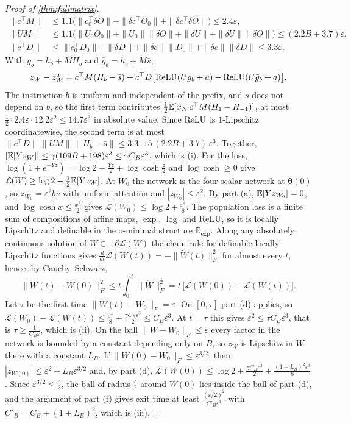 \begin{proof}[Proof of \cref{thm:fullmatrix}]
\begin{align*}
 \|c^\top M\|&\le1.1\bigl(\|c_0^\top\delta O\|+\|\delta c^\top O_0\|+\|\delta c^\top\delta O\|\bigr)\le2.4\varepsilon,\\
 \|UM\|&\le1.1\bigl(\|U_0O_0\|+\|U_0\|\|\delta O\|+\|\delta U\|+\|\delta U\|\|\delta O\|\bigr)\le(2.2B+3.7)\varepsilon,\\
 \|c^\top D\|&\le\|c_0^\top D_0\|+\|\delta D\|+\|\delta c\|\|D_0\|+\|\delta c\|\|\delta D\|\le3.3\varepsilon .
\end{align*}
With $g_b=h_b+MH_b$ and $\bar g_b=h_b+M\bar s$,
\[
 z_W-z^{\mathrm u}_W=c^\top M(H_b-\bar s)+c^\top D\bigl[\operatorname{ReLU}(Ug_b+a)-\operatorname{ReLU}(U\bar g_b+a)\bigr].
\]
The instruction $b$ is uniform and independent of the prefix, and $\bar s$ does not depend on $b$, so the first term contributes
$\tfrac12\mathbb E[x_N\,c^\top M(H_1-H_{-1})]$, at most $\tfrac12\cdot2.4\varepsilon\cdot12.2\varepsilon^2\le14.7\varepsilon^3$ in absolute value.
Since $\operatorname{ReLU}$ is $1$-Lipschitz coordinatewise, the second term is at most $\|c^\top D\|\,\|UM\|\,\|H_b-\bar s\|\le3.3\cdot15\,(2.2B+3.7)\,\varepsilon^3$.
Together, $|\mathbb E[Yz_W]|\le\gamma(109B+198)\varepsilon^3\le\gamma C_B\varepsilon^3$, which is (i).
For the loss, $\log(1+e^{-Yz})=\log2-\tfrac{Yz}{2}+\log\cosh\tfrac{z}{2}$ and $\log\cosh\ge0$ give $\mathcal L(W)\ge\log2-\tfrac12\mathbb E[Yz_W]$.
At $W_0$ the network is the four-scalar network at $\bm\theta(0)$, so $z_{W_0}=\varepsilon^2bv$ with uniform attention and $|z_{W_0}|\le\varepsilon^2$.
By part (a), $\mathbb E[Yz_{W_0}]=0$, and $\log\cosh x\le\tfrac{x^2}{2}$ gives $\mathcal L(W_0)\le\log2+\tfrac{\varepsilon^4}{8}$.
The population loss is a finite sum of compositions of affine maps, $\exp$, $\log$ and $\operatorname{ReLU}$, so it is locally Lipschitz and definable in the o-minimal structure $\mathbb R_{\exp}$.
Along any absolutely continuous solution of $\dot W\in-\partial\mathcal L(W)$ the chain rule for definable locally Lipschitz functions \citep{davis2020stochastic} gives
$\tfrac{d}{dt}\mathcal L(W(t))=-\|\dot W(t)\|_F^2$ for almost every $t$, hence, by Cauchy--Schwarz,
\[
 \|W(t)-W(0)\|_F^2\le t\int_0^t\|\dot W\|_F^2=t\,\bigl[\mathcal L(W(0))-\mathcal L(W(t))\bigr].
\]
Let $\tau$ be the first time $\|W(t)-W_0\|_F=\varepsilon$. On $[0,\tau]$ part (d) applies, so $\mathcal L(W_0)-\mathcal L(W(t))\le\tfrac{\varepsilon^4}{8}+\tfrac{\gamma C_B\varepsilon^3}{2}\le C_B\varepsilon^3$.
At $t=\tau$ this gives $\varepsilon^2\le\tau C_B\varepsilon^3$, that is $\tau\ge\tfrac{1}{C_B\varepsilon}$, which is (ii).
On the ball $\|W-W_0\|_F\le\varepsilon$ every factor in the network is bounded by a constant depending only on $B$, so $z_W$ is Lipschitz in $W$ there with a constant $L_B$.
If $\|W(0)-W_0\|_F\le\varepsilon^{3/2}$, then $|z_{W(0)}|\le\varepsilon^2+L_B\varepsilon^{3/2}$ and, by part (d),
$\mathcal L(W(0))\le\log2+\tfrac{\gamma C_B\varepsilon^3}{2}+\tfrac{(1+L_B)^2\varepsilon^3}{8}$.
Since $\varepsilon^{3/2}\le\tfrac{\varepsilon}{2}$, the ball of radius $\tfrac{\varepsilon}{2}$ around $W(0)$ lies inside the ball of part (d), and the argument of part (f) gives exit time at least
$\tfrac{(\varepsilon/2)^2}{C'_B\varepsilon^3}$ with $C'_B=C_B+(1+L_B)^2$, which is (iii).\qedhere
\end{proof}
